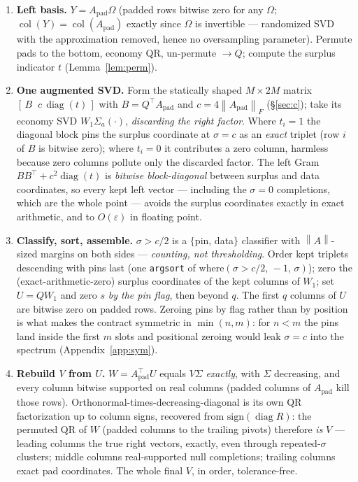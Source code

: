 \documentclass[11pt]{article}
\theoremstyle{definition}
\theoremstyle{remark}
\newcommand{\Apad}{A_{\mathrm{pad}}}
\newcommand{\diag}{\operatorname{diag}}
\newcommand{\col}{\operatorname{col}}
\newcommand{\norm}[1]{\left\lVert #1 \right\rVert}
\newcommand{\code}[1]{\texttt{#1}}
\begin{document}
\begin{enumerate}[label=\textbf{Step \arabic*.},leftmargin=2.1cm,itemsep=3pt]
\item \textbf{Left basis.} $Y = \Apad\Omega$ (padded rows bitwise zero for any $\Omega$;
$\col(Y) = \col(\Apad)$ exactly since $\Omega$ is invertible --- randomized SVD with the
approximation removed, hence no oversampling parameter). Permute pads to the bottom, economy QR,
un-permute $\to Q$; compute the surplus indicator $t$ (Lemma~\ref{lem:perm}).
\item \textbf{One augmented SVD.} Form the statically shaped $M\times 2M$ matrix
$[\,B \;\; c\,\diag(t)\,]$ with $B = Q^{\top}\Apad$ and $c = 4\norm{\Apad}_F$
(\S\ref{sec:c}); take its economy SVD $W_1\Sigma_a(\cdot)$, \emph{discarding the right factor}.
Where $t_i=1$ the diagonal block pins the surplus coordinate at $\sigma=c$ as an \emph{exact}
triplet (row $i$ of $B$ is bitwise zero); where $t_i=0$ it contributes a zero column, harmless
because zero columns pollute only the discarded factor. The left Gram
$BB^{\top} + c^2\diag(t)$ is \emph{bitwise block-diagonal} between surplus and data coordinates, so
every kept left vector --- including the $\sigma=0$ completions, which are the whole point ---
avoids the surplus coordinates exactly in exact arithmetic, and to $O(\varepsilon)$ in floating
point.
\item \textbf{Classify, sort, assemble.} $\sigma > c/2$ is a $\{$pin, data$\}$ classifier with
$\norm{A}$-sized margins on both sides --- \emph{counting, not thresholding}. Order kept triplets
descending with pins last (one \code{argsort} of $\mathrm{where}(\sigma>c/2,\,-1,\,\sigma)$); zero
the (exact-arithmetic-zero) surplus coordinates of the kept columns of $W_1$; set $U = QW_1$ and
zero $s$ \emph{by the pin flag}, then beyond $q$. The first $q$ columns of $U$ are bitwise zero on
padded rows. Zeroing pins by flag rather than by position is what makes the contract symmetric in
$\min(n,m)$: for $n<m$ the pins land inside the first $m$ slots and positional zeroing would leak
$\sigma=c$ into the spectrum (Appendix~\ref{app:sym}).
\item \textbf{Rebuild $V$ from $U$.} $W = \Apad^{\top}U$ equals $V\Sigma$ \emph{exactly}, with
$\Sigma$ decreasing, and every column bitwise supported on real columns (padded columns of $\Apad$
kill those rows). Orthonormal-times-decreasing-diagonal is its own QR factorization up to column
signs, recovered from $\mathrm{sign}(\diag R)$: the permuted QR of $W$ (padded columns to the
trailing pivots) therefore \emph{is} $V$ --- leading columns the true right vectors, exactly, even
through repeated-$\sigma$ clusters; middle columns real-supported null completions; trailing
columns exact pad coordinates. The whole final $V$, in order, tolerance-free.
\end{enumerate}
\end{document}
